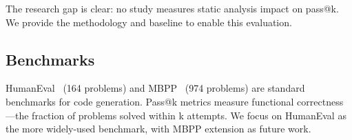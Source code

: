 The research gap is clear: no study measures static analysis impact on pass@k. We provide the methodology and baseline to enable this evaluation.

\subsection{Benchmarks}

HumanEval~\cite{chen2021humaneval} (164 problems) and MBPP~\cite{austin2021mbpp} (974 problems) are standard benchmarks for code generation. Pass@k metrics measure functional correctness---the fraction of problems solved within k attempts. We focus on HumanEval as the more widely-used benchmark, with MBPP extension as future work.

